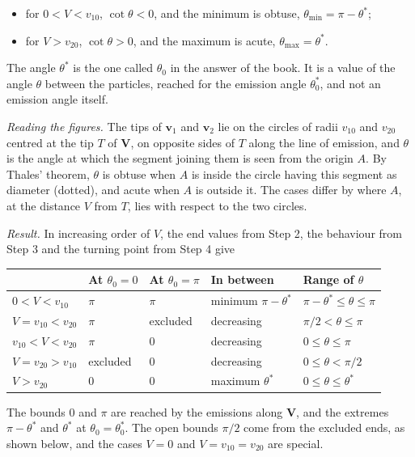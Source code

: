 \begin{problem}[title={Range of angles between two decay products}]
{\begin{itemize}
    \item for $0<V<v_{10}$, $\cot{\theta}<0$, and the minimum is obtuse, $\theta_{\mathrm{min}} = \pi-\theta^*$;
    \item for $V>v_{20}$, $\cot{\theta}>0$, and the maximum is acute, $\theta_{\mathrm{max}} = \theta^*$.
\end{itemize}
The angle $\theta^*$ is the one called $\theta_0$ in the answer of the book. It is a value of the angle $\theta$ between the particles, reached for the emission angle $\theta_0^*$, and not an emission angle itself.

\textit{Reading the figures.} The tips of $\mathbf{v}_1$ and $\mathbf{v}_2$ lie on the circles of radii $v_{10}$ and $v_{20}$ centred at the tip $T$ of $\mathbf{V}$, on opposite sides of $T$ along the line of emission, and $\theta$ is the angle at which the segment joining them is seen from the origin $A$. By Thales' theorem, $\theta$ is obtuse when $A$ is inside the circle having this segment as diameter (dotted), and acute when $A$ is outside it. The cases differ by where $A$, at the distance $V$ from $T$, lies with respect to the two circles.

\textit{Result.} In increasing order of $V$, the end values from Step 2, the behaviour from Step 3 and the turning point from Step 4 give
\begin{center}
\renewcommand{\arraystretch}{1.3}
\begin{tabular}{lllll}
    \hline
    & At $\theta_0=0$ & At $\theta_0=\pi$ & In between & Range of $\theta$ \\
    \hline
    $0<V<v_{10}$ & $\pi$ & $\pi$ & minimum $\pi-\theta^*$ & $\pi-\theta^* \leq \theta \leq \pi$ \\
    $V=v_{10}<v_{20}$ & $\pi$ & excluded & decreasing & $\pi/2 < \theta \leq \pi$ \\
    $v_{10}<V<v_{20}$ & $\pi$ & $0$ & decreasing & $0 \leq \theta \leq \pi$ \\
    $V=v_{20}>v_{10}$ & excluded & $0$ & decreasing & $0 \leq \theta < \pi/2$ \\
    $V>v_{20}$ & $0$ & $0$ & maximum $\theta^*$ & $0 \leq \theta \leq \theta^*$ \\
    \hline
\end{tabular}
\end{center}
The bounds $0$ and $\pi$ are reached by the emissions along $\mathbf{V}$, and the extremes $\pi-\theta^*$ and $\theta^*$ at $\theta_0 = \theta_0^*$. The open bounds $\pi/2$ come from the excluded ends, as shown below, and the cases $V = 0$ and $V = v_{10} = v_{20}$ are special.

}
\end{problem}
